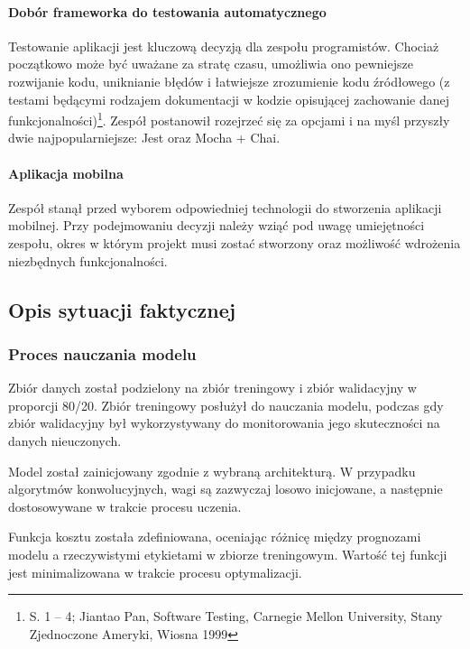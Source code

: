 \documentclass[12pt, a4paper, twoside, openany]{book}
\newcommand{\forceindent}{\leavevmode{\parindent=1.3em\indent}}
\begin{document}
{\paragraph{Dobór frameworka do testowania automatycznego\\}
\forceindent Testowanie aplikacji jest kluczową decyzją dla zespołu programistów.
Chociaż początkowo może być uważane za stratę czasu, umożliwia ono pewniejsze rozwijanie kodu, uniknianie błędów i łatwiejsze zrozumienie kodu źródłowego (z testami będącymi rodzajem dokumentacji w kodzie opisującej zachowanie danej funkcjonalności)\footnote{S. 1 -- 4; Jiantao Pan, Software Testing, Carnegie Mellon University, Stany Zjednoczone Ameryki, Wiosna 1999}.
Zespół postanowił rozejrzeć się za opcjami i na myśl przyszły dwie najpopularniejsze: Jest oraz Mocha + Chai.

\newpage
\paragraph{Aplikacja mobilna\\}
\forceindent Zespół stanął przed wyborem odpowiedniej technologii do stworzenia aplikacji mobilnej. Przy podejmowaniu decyzji należy wziąć pod uwagę umiejętności zespołu, okres w którym projekt musi zostać stworzony oraz możliwość wdrożenia niezbędnych funkcjonalności.
\subsection{Opis sytuacji faktycznej}

\subsubsection{Proces nauczania modelu}
\forceindent Zbiór danych został podzielony na zbiór treningowy i zbiór walidacyjny w proporcji 80/20.
Zbiór treningowy posłużył do nauczania modelu, podczas gdy zbiór walidacyjny był wykorzystywany do monitorowania jego skuteczności na danych nieuczonych.

Model został zainicjowany zgodnie z wybraną architekturą. W przypadku algorytmów konwolucyjnych, wagi są zazwyczaj losowo inicjowane, a następnie dostosowywane w trakcie procesu uczenia.

Funkcja kosztu została zdefiniowana, oceniając różnicę między prognozami modelu a rzeczywistymi etykietami w zbiorze treningowym.
Wartość tej funkcji jest minimalizowana w trakcie procesu optymalizacji.

}
\end{document}
